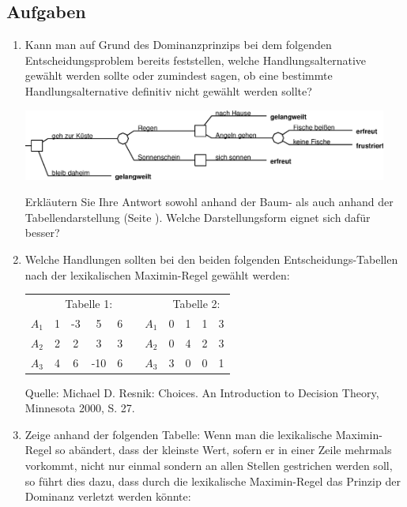\subsection{Aufgaben}

\begin{enumerate}

 \item Kann man auf Grund des Dominanz\-prinzips bei dem folgenden
 Ent\-scheidungs\-problem bereits feststellen, welche 
Handlungsalternative gewählt werden
sollte oder zumindest sagen, ob eine bestimmte
Handlungsalternative definitiv nicht gewählt werden sollte? 

\begin{center}
\includegraphics[width=12cm]{Grafiken/Beispiel1_2.eps}
\end{center} 

Erkläutern Sie Ihre
Antwort sowohl anhand der Baum- als auch anhand der Tabellendarstellung (Seite
\pageref{AngelnBeispiel}). Welche Darstellungsform eignet sich dafür besser?

\item Welche Handlungen sollten bei den beiden folgenden Entscheidungs-Tabellen
nach der lexikalischen Maximin-Regel gewählt werden:

\begin{center}
\begin{tabular}{c|c|c|c|c|cc|c|c|c|c|}
\multicolumn{1}{c}{} & \multicolumn{4}{c}{Tabelle 1:} &
\multicolumn{2}{c}{} & \multicolumn{4}{c}{Tabelle 2:}
\\
\cline{2-5} \cline{8-11}
$A_1$ & 1 & -3 & 5   & 6 & & $A_1$ & 0 & 1 & 1 & 3 \\ 
\cline{2-5} \cline{8-11} 
$A_2$ & 2 &  2 & 3   & 3 & & $A_2$ & 0 & 4 & 2 & 3 \\ 
\cline{2-5} \cline{8-11}
$A_3$ & 4 &  6 & -10 & 6 & & $A_3$ & 3 & 0 & 0 & 1 \\ 
\cline{2-5} \cline{8-11}
\end{tabular}

{\tiny Quelle: Michael D. Resnik: Choices. An Introduction to Decision Theory,
Minnesota 2000, S. 27.}
\end{center}

\item Zeige anhand der folgenden Tabelle: Wenn man die lexikalische
Maximin-Regel so abändert, dass der kleinste Wert, sofern er in einer
Zeile mehrmals vorkommt, nicht nur einmal sondern an allen Stellen gestrichen
werden soll, so führt dies dazu, dass durch die lexikalische Maximin-Regel das
Prinzip der Dominanz verletzt werden könnte:


\end{enumerate}
